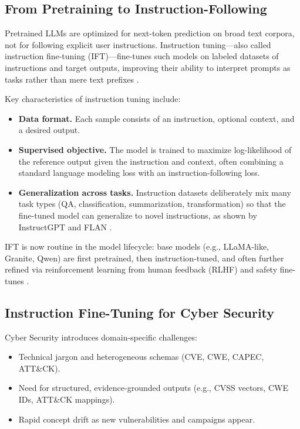 \documentclass[unnumsec,webpdf,contemporary,large]{oup-authoring-template}
\theoremstyle{thmstyleone}
\theoremstyle{thmstyletwo}
\theoremstyle{thmstylethree}
\begin{document}
\subsection{From Pretraining to Instruction-Following}

Pretrained LLMs are optimized for next-token prediction on broad text corpora, not for following explicit user instructions. Instruction tuning---also called instruction fine-tuning (IFT)---fine-tunes such models on labeled datasets of instructions and target outputs, improving their ability to interpret prompts as tasks rather than mere text prefixes \cite{wei2022flan,ouyang2022instructgpt}.

Key characteristics of instruction tuning include:

\begin{itemize}
  \item \textbf{Data format.} Each sample consists of an instruction, optional context, and a desired output.
  \item \textbf{Supervised objective.} The model is trained to maximize log-likelihood of the reference output given the instruction and context, often combining a standard language modeling loss with an instruction-following loss.
  \item \textbf{Generalization across tasks.} Instruction datasets deliberately mix many task types (QA, classification, summarization, transformation) so that the fine-tuned model can generalize to novel instructions, as shown by InstructGPT and FLAN \cite{wei2022flan,ouyang2022instructgpt}.
\end{itemize}

IFT is now routine in the model lifecycle: base models (e.g., LLaMA-like, Granite, Qwen) are first pretrained, then instruction-tuned, and often further refined via reinforcement learning from human feedback (RLHF) and safety fine-tunes \cite{ouyang2022instructgpt}.

\subsection{Instruction Fine-Tuning for Cyber Security}

Cyber Security introduces domain-specific challenges:

\begin{itemize}
  \item Technical jargon and heterogeneous schemas (CVE, CWE, CAPEC, ATT\&CK).
  \item Need for structured, evidence-grounded outputs (e.g., CVSS vectors, CWE IDs, ATT\&CK mappings).
  \item Rapid concept drift as new vulnerabilities and campaigns appear.
\end{itemize}
\end{document}
